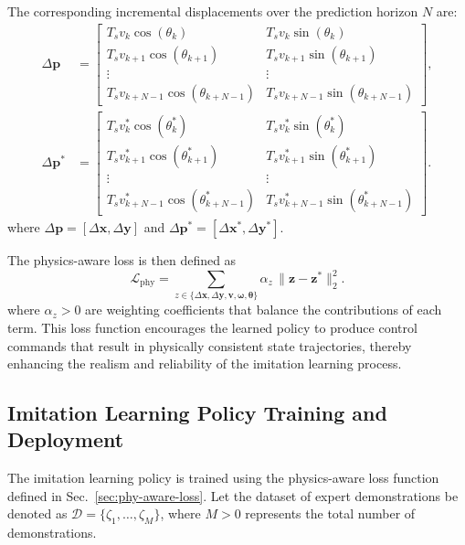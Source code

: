 \documentclass[letterpaper, 10 pt, conference]{ieeeconf}
\begin{document}
The corresponding incremental displacements over the prediction horizon $N$ are:
\begin{equation}
  \begin{aligned}
    \Delta \mathbf{p} &=
    \begin{bmatrix}
      T_s v_k \cos(\theta_k) & T_s v_k \sin(\theta_k) \\
      T_s v_{k+1} \cos(\theta_{k+1}) & T_s v_{k+1} \sin(\theta_{k+1}) \\
      \vdots & \vdots \\
      T_s v_{k+N-1} \cos(\theta_{k+N-1}) & T_s v_{k+N-1} \sin(\theta_{k+N-1})
    \end{bmatrix}, \\
    \Delta \mathbf{p}^* &=
    \begin{bmatrix}
      T_s v_k^* \cos(\theta_k^*) & T_s v_k^* \sin(\theta_k^*) \\
      T_s v_{k+1}^* \cos(\theta_{k+1}^*) & T_s v_{k+1}^* \sin(\theta_{k+1}^*) \\
      \vdots & \vdots \\
      T_s v_{k+N-1}^* \cos(\theta_{k+N-1}^*) & T_s v_{k+N-1}^* \sin(\theta_{k+N-1}^*)
    \end{bmatrix}.
  \end{aligned}
\end{equation}
where $\Delta \mathbf{p} = [\Delta \mathbf{x}, \Delta \mathbf{y}]$ and $\Delta \mathbf{p}^* = [\Delta \mathbf{x}^*, \Delta \mathbf{y}^*]$.

The physics-aware loss is then defined as
\begin{equation}
  \mathcal{L}_{\text{phy}} =
  \sum_{z \in \{\Delta \mathbf{x}, \Delta \mathbf{y}, \mathbf{v}, \boldsymbol{\omega}, \boldsymbol{\theta}\}}
  \alpha_z \,\|\mathbf{z}-\mathbf{z}^*\|_2^2.
\end{equation}
where $\alpha_z>0$ are weighting coefficients that balance the contributions of each term. This loss function encourages the learned policy to produce control commands that result in physically consistent state trajectories, thereby enhancing the realism and reliability of the imitation learning process.

\subsection{Imitation Learning Policy Training and Deployment}

The imitation learning policy is trained using the physics-aware loss function defined in Sec.~\ref{sec:phy-aware-loss}. Let the dataset of expert demonstrations be denoted as $\mathcal{D}=\{\zeta_1,\dots,\zeta_M\}$, where $M > 0$ represents the total number of demonstrations.
\end{document}
